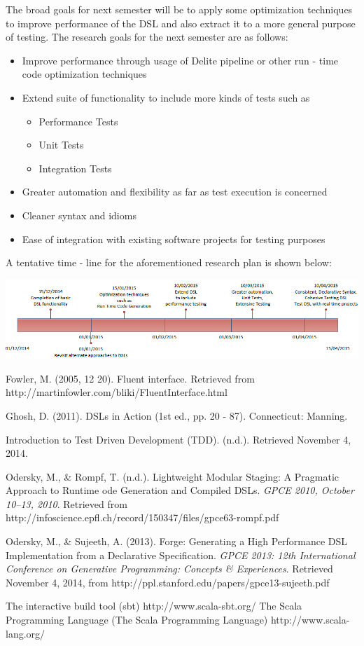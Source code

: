 \documentclass[12 pt]{article}
\begin{document}
\noindent
The broad goals for next semester will be to apply some optimization techniques to improve performance of the DSL and also extract it to a more general purpose of testing. The research goals for the next semester are as follows:
\begin{itemize}
\item Improve performance through usage of Delite pipeline or other run - time code optimization techniques
\item Extend suite of functionality to include more kinds of tests such as
    \begin{itemize}
    \item Performance Tests
    \item Unit Tests
    \item Integration Tests
    \end{itemize}
\item Greater automation and flexibility as far as test execution is concerned
\item Cleaner syntax and idioms
\item Ease of integration with existing software projects for testing purposes
\end{itemize}
\bigskip

\noindent
A tentative time - line for the aforementioned research plan is shown below:
\bigskip
\centerline{\includegraphics[width=600px]{figures/timeline.png}}

\newpage
\begin{thebibliography}{9}

 Fowler, M. (2005, 12 20). Fluent interface. 
Retrieved from http://martinfowler.com/bliki/FluentInterface.html

Ghosh, D. (2011). DSLs in Action (1st ed., pp. 20 - 87). Connecticut: Manning.

 Introduction to Test Driven Development (TDD). (n.d.). Retrieved November 4, 2014.

 Odersky, M., \& Rompf, T. (n.d.). Lightweight Modular Staging: 
A Pragmatic Approach to Runtime ode Generation and Compiled DSLs. \textit{GPCE 2010, October 10–13, 2010}. Retrieved from http://infoscience.epfl.ch/record/150347/files/gpce63-rompf.pdf

 Odersky, M., \& Sujeeth, A. (2013). Forge: Generating a 
High Performance DSL Implementation from a Declarative Speciﬁcation. \textit{GPCE 2013: 12th International Conference on Generative Programming: Concepts \& Experiences}. 
Retrieved November 4, 2014, from http://ppl.stanford.edu/papers/gpce13-sujeeth.pdf

 The interactive build tool (sbt) http://www.scala-sbt.org/
 The Scala Programming Language (The Scala Programming Language)
http://www.scala-lang.org/
\end{thebibliography}
\end{document}

